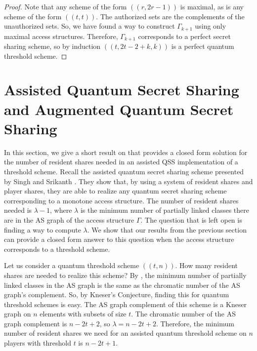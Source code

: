 \begin{proof}
    Note that any scheme of the form $((r,2r-1))$ is maximal, as is any scheme of the form $((t,t))$. The authorized sets are the complements of the unauthorized sets. So, we have found a way to construct $\Gamma_{k+1}$ using only maximal access structures. Therefore, $\Gamma_{k+1}$ corresponds to a perfect secret sharing scheme, so by induction $((t,2t-2+k,k))$ is a perfect quantum threshold scheme.
\end{proof}

\section{Assisted Quantum Secret Sharing and Augmented Quantum Secret Sharing}
\label{sec:aqss-and-aqss}

In this section, we give a short result on that provides a closed form solution for the number of resident shares needed in an assisted QSS implementation of a threshold scheme. Recall the assisted quantum secret sharing scheme presented by Singh and Srikanth \cite{singh_assisted_2004}. They show that, by using a system of resident shares and player shares, they are able to realize any quantum secret sharing scheme corresponding to a monotone access structure. The number of resident shares needed is $\lambda-1$, where $\lambda$ is the minimum number of partially linked classes there are in the AS graph of the access structure $\Gamma$. The question that is left open is finding a way to compute $\lambda$. We show that our results from the previous section can provide a closed form answer to this question when the access structure corresponds to a threshold scheme.

Let us consider a quantum threshold scheme $((t,n))$. How many resident shares are needed to realize this scheme? By , the minimum number of partially linked classes in the AS graph is the same as the chromatic number of the AS graph's complement. So, by Kneser's Conjecture, finding this for quantum threshold schemes is easy. The AS graph complement of this scheme is a Kneser graph on $n$ elements with subsets of size $t$. The chromatic number of the AS graph complement is $n-2t+2$, so $\lambda = n-2t+2$. Therefore, the minimum number of resident shares we need for an assisted quantum threshold scheme on $n$ players with threshold $t$ is $n-2t+1$.